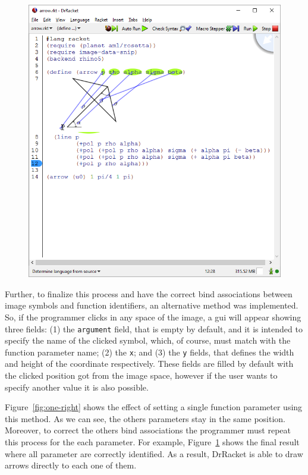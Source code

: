 \begin{figure}[!h]
\begin{minipage}[t]{.495\textwidth}
  \includegraphics[width=1\linewidth]{images/4}
  \label{fig:alright}
\end{minipage}
\end{figure}

Further, to finalize this process and have the correct bind associations between image symbols and function identifiers, an alternative method was implemented. So, if the programmer clicks in any space of the image, a \gls{gui} will appear showing three fields: (1) the \texttt{argument} field, that is empty by default, and it is intended to specify the name of the clicked symbol, which, of course, must match with the function parameter name; (2) the \texttt{x}; and (3) the \texttt{y} fields, that defines the width and height of the coordinate respectively. These fields are filled by default with the clicked position got from the image space, however if the user wants to specify another value it is also possible.

Figure~\ref{fig:one-right} shows the effect of setting a single function parameter using this method. As we can see, the others parameters stay in the same position. Moreover, to correct the others bind associations the programmer must repeat this process for the each parameter. For example, Figure~\ref{fig:alright} shows the final result where all parameter are correctly identified. As a result, DrRacket is able to draw arrows directly to each one of them. 

